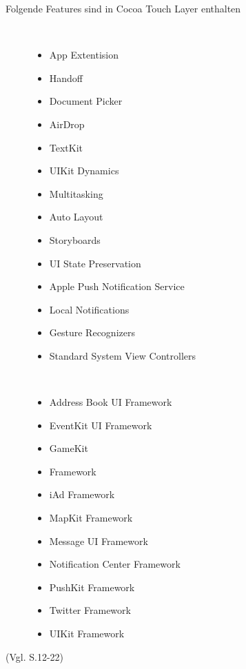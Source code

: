 \begin{description}
\item[Folgende Features sind in Cocoa Touch Layer enthalten]~\par
	\begin{multicols}{2}
	\begin{itemize}
		\item App Extentision
		\item Handoff
		\item Document Picker
		\item AirDrop
		\item TextKit
		\item UIKit Dynamics
		\item Multitasking
		\item Auto Layout
		\item Storyboards
		\item UI State Preservation
		\item Apple Push Notification Service
		\item Local Notifications
		\item Gesture Recognizers
		\item Standard System View Controllers
         \end{itemize}
	\end{multicols}	
	 \item[\parbox{\textwidth} {Das Cocoa Touch Layer Framework beinhaltet folgende Frameworks}]~\par
	\begin{multicols}{2}
	\begin{itemize}
		\item Address Book UI Framework
		\item EventKit UI Framework
		\item GameKit
		\item  Framework
		\item iAd Framework
		\item MapKit Framework
		\item Message UI Framework
		\item Notification Center Framework
		\item PushKit Framework
		\item Twitter Framework
		\item UIKit Framework
         \end{itemize}
	\end{multicols}
\end{description}
(Vgl. \cite{Apple[6]} S.12-22)

